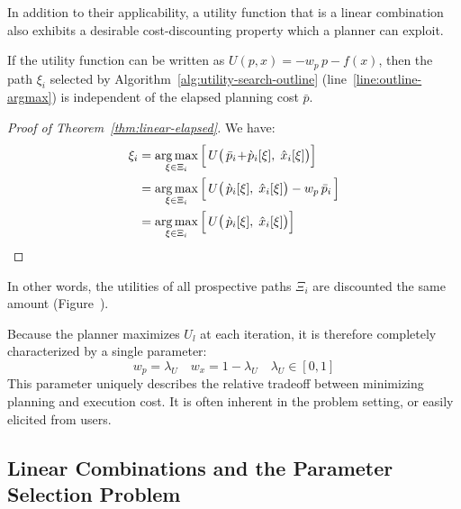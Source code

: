 In addition to their applicability,
a utility function that is a linear combination
also exhibits a desirable cost-discounting property which a planner
can exploit.

\begin{theorem}
   \label{thm:linear-elapsed}
   If the utility function can be written as $U(p,x) = - w_p \, p - f(x)$,
   then the path $\xi_i$ selected by
   Algorithm~\ref{alg:utility-search-outline}
   (line~\ref{line:outline-argmax})
   is independent of the elapsed planning cost $\bar{p}$.
\end{theorem}

\begin{proof}[Proof of Theorem~\ref{thm:linear-elapsed}]
   We have:
   \begin{align}
      \xi_i &= \operatorname*{arg\,max}_{\xi \in \Xi_i}
      \Big[ \, U\big( \, \bar{p}_i \! + \! \grave{p}_i[\xi], \; \hat{x}_i[\xi] \big) \Big] \\
      &= \operatorname*{arg\,max}_{\xi \in \Xi_i}
      \Big[ \,  U\big( \, \grave{p}_i[\xi], \; \hat{x}_i[\xi] \big) - w_p \, \bar{p}_i \, \Big] \\
      &= \operatorname*{arg\,max}_{\xi \in \Xi_i}
      \Big[ \, U\big( \, \grave{p}_i[\xi], \; \hat{x}_i[\xi] \big) \Big]
   \end{align}
\end{proof}

In other words, the utilities of all prospective paths $\Xi_i$
are discounted the same amount
(Figure~).

Because the planner maximizes $U_l$ at each iteration,
it is therefore completely characterized by a single parameter:
\begin{equation}
   w_p = \lambda_U \quad w_x = 1 - \lambda_U \quad
   \lambda_U \in [0,1]
\end{equation}
This parameter uniquely describes the relative tradeoff between
minimizing planning and execution cost.
It is often inherent in the problem setting,
or easily elicited from users.

\subsection{Linear Combinations and the Parameter Selection Problem}

